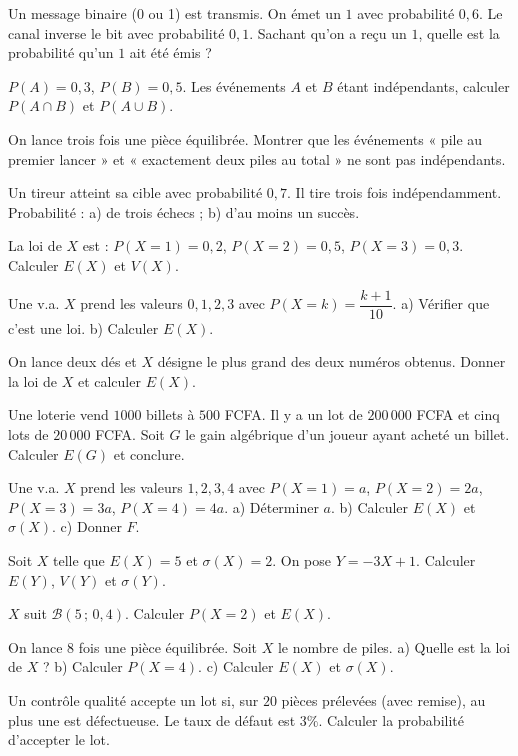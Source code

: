 \exo{} Un message binaire (0 ou 1) est transmis. On émet un $1$ avec
probabilité $0{,}6$. Le canal inverse le bit avec probabilité $0{,}1$. Sachant
qu'on a reçu un $1$, quelle est la probabilité qu'un $1$ ait été émis ?

\exo{} $P(A)=0{,}3$, $P(B)=0{,}5$. Les événements $A$ et $B$ étant
indépendants, calculer $P(A\cap B)$ et $P(A\cup B)$.

\exo{} On lance trois fois une pièce équilibrée. Montrer que les événements
« pile au premier lancer » et « exactement deux piles au total » ne sont pas
indépendants.

\exo{} Un tireur atteint sa cible avec probabilité $0{,}7$. Il tire trois
fois indépendamment. Probabilité : a) de trois échecs ; b) d'au moins un succès.

\exo{} La loi de $X$ est : $P(X{=}1)=0{,}2$, $P(X{=}2)=0{,}5$,
$P(X{=}3)=0{,}3$. Calculer $E(X)$ et $V(X)$.

\exo{} Une v.a. $X$ prend les valeurs $0,1,2,3$ avec
$P(X{=}k)=\dfrac{k+1}{10}$. a) Vérifier que c'est une loi. b) Calculer $E(X)$.

\exo{} On lance deux dés et $X$ désigne le plus grand des deux numéros
obtenus. Donner la loi de $X$ et calculer $E(X)$.

\exo{} Une loterie vend $1000$ billets à $500$ FCFA. Il y a un lot de
$200\,000$ FCFA et cinq lots de $20\,000$ FCFA. Soit $G$ le gain algébrique d'un
joueur ayant acheté un billet. Calculer $E(G)$ et conclure.

\exo{} Une v.a. $X$ prend les valeurs $1,2,3,4$ avec
$P(X{=}1)=a$, $P(X{=}2)=2a$, $P(X{=}3)=3a$, $P(X{=}4)=4a$. a) Déterminer $a$.
b) Calculer $E(X)$ et $\sigma(X)$. c) Donner $F$.

\exo{} Soit $X$ telle que $E(X)=5$ et $\sigma(X)=2$. On pose $Y=-3X+1$.
Calculer $E(Y)$, $V(Y)$ et $\sigma(Y)$.

\exo{} $X$ suit $\mathcal B(5\,;\,0{,}4)$. Calculer $P(X{=}2)$ et $E(X)$.

\exo{} On lance $8$ fois une pièce équilibrée. Soit $X$ le nombre de piles.
a) Quelle est la loi de $X$ ? b) Calculer $P(X{=}4)$. c) Calculer $E(X)$ et $\sigma(X)$.

\exo{} Un contrôle qualité accepte un lot si, sur $20$ pièces prélevées
(avec remise), au plus une est défectueuse. Le taux de défaut est $3\%$. Calculer
la probabilité d'accepter le lot.

